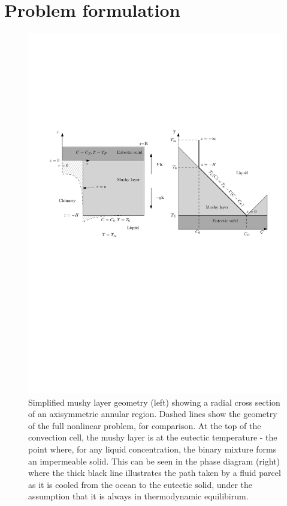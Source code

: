 \documentclass[11pt]{proc}
\begin{document}
\section{Problem formulation}
\label{sec:problem-formulation}

\begin{figure}[t]
    \centering
       \includegraphics[width=\textwidth]{simplified-arrangement}
       \caption{Simplified mushy layer geometry (left) showing a radial cross section of an axisymmetric annular region. Dashed lines show the geometry of the full nonlinear problem, for comparison. At the top of the convection cell, the mushy layer is at the eutectic temperature - the point where, for any liquid concentration, the binary mixture forms an impermeable solid. This can be seen in the phase diagram (right) where the thick black line illustrates the path taken by a fluid parcel as it is cooled from the ocean to the eutectic solid, under the assumption that it is always in thermodynamic equilibirum.}
    \label{fig:arrangement}
\end{figure}
\end{document}
